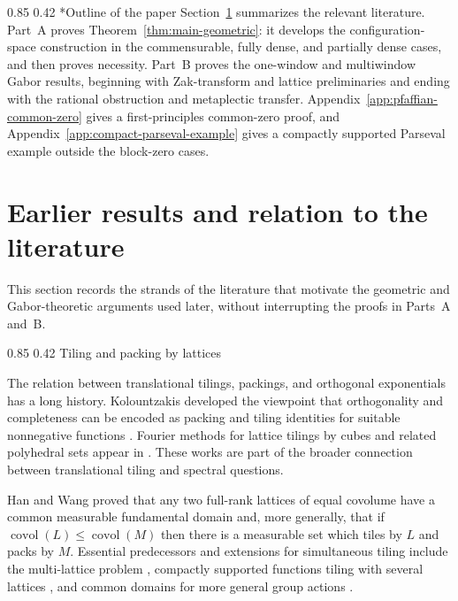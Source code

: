 \documentclass[11pt,reqno]{amsart}
\makeatletter
\numberwithin{equation}{section}
\renewcommand\subsection{\@startsection{subsection}{2}{\z@}%
  {0.85\baselineskip \@plus 0.25\baselineskip \@minus 0.10\baselineskip}%
  {0.42\baselineskip}%
  {\normalfont\bfseries}}
\theoremstyle{definition}
\theoremstyle{remark}
\newcommand{\covol}{\operatorname{covol}}
\makeatother
\begin{document}
\subsection*{Outline of the paper}
Section~\ref{sec:literature} summarizes the relevant literature.  Part~A
proves Theorem~\ref{thm:main-geometric}: it develops the configuration-space
construction in the commensurable, fully dense, and partially dense cases,
and then proves necessity.  Part~B proves the one-window and multiwindow
Gabor results, beginning with Zak-transform and lattice preliminaries and
ending with the rational obstruction and metaplectic transfer.  Appendix~\ref{app:pfaffian-common-zero} gives a first-principles
common-zero proof, and Appendix~\ref{app:compact-parseval-example} gives a
compactly supported Parseval example outside the block-zero cases.

\section{Earlier results and relation to the literature}\label{sec:literature}

This section records the strands of the literature that motivate the geometric and
Gabor-theoretic arguments used later, without interrupting the proofs in Parts~A and~B.

\subsection{Tiling and packing by lattices}\label{sec:lit-tiling}

The relation between translational tilings, packings, and orthogonal
exponentials has a long history.  Kolountzakis developed the viewpoint that
orthogonality and completeness can be encoded as packing and tiling
identities for suitable nonnegative functions
\cite{Kolountzakis2000Packing}.  Fourier methods for lattice tilings by
cubes and related polyhedral sets appear in
\cite{Kolountzakis1998Cubes}.  These works are part of the broader
connection between translational tiling and spectral questions.

Han and Wang \cite{HanWang2001} proved that any two full-rank lattices of
equal covolume have a common measurable fundamental domain and, more
generally, that if $\covol(L)\le\covol(M)$ then there is a measurable set
which tiles by $L$ and packs by $M$.  Essential predecessors and extensions
for simultaneous tiling include the multi-lattice problem
\cite{Kolountzakis1997MultiLattice}, compactly supported functions tiling
with several lattices \cite{KolountzakisPapageorgiou2022}, and common
domains for more general group actions
\cite{DutkayHanJorgensenPicioroaga2013}.
\end{document}
